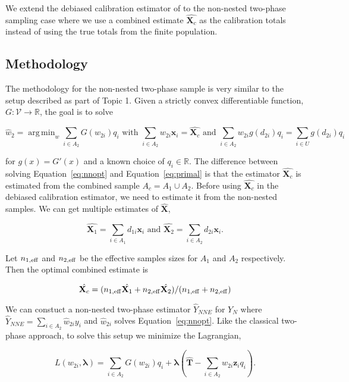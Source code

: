 \documentclass[12pt]{article}
\DeclareMathOperator*{\argmin}{arg\,min}
\renewcommand{\bf}[1]{\mathbf{#1}}
\begin{document}
We extend the debiased calibration estimator of \cite{kwon2024debiased} to the
non-nested two-phase sampling case where we use a combined estimate 
$\hat{\bm X_c}$ as the calibration totals instead of using the true totals from
the finite population.

\subsection{Methodology}

The methodology for the non-nested two-phase sample is very similar to the setup
described as part of Topic 1. Given a strictly convex differentiable function,
$G: \mathcal{V} \to \mathbb{R}$, the goal is to solve

\begin{equation}\label{eq:nnopt}
\hat w_2 = \argmin_w \sum_{i \in A_2} G\left(w_{2i}\right) q_i 
\text{ with } 
\sum_{i \in A_2} w_{2i} \bf x_i = \hat{\bf X_{c}} \text{ and } 
\sum_{i \in A_2} w_{2i} g(d_{2i}) q_i = \sum_{i \in U} g(d_{2i}) q_i
\end{equation}

for $g(x) = G'(x)$ and a known choice of $q_i \in \mathbb{R}$. 
The difference
between solving Equation~\ref{eq:nnopt} and Equation~\ref{eq:primal} is that the
estimator $\hat{\bf X_c}$ is estimated from the combined sample $A_c = A_1 \cup
A_2$. Before using $\hat{\bf X_c}$ in the debiased calibration estimator, we
need to estimate it from the non-nested samples. We can get multiple estimates
of $\hat{\bf X}$, 

$$
\hat{\bf X_1} = \sum_{i \in A_1} d_{1i} \bf x_i \text{ and }
\hat{\bf X_2} = \sum_{i \in A_2} d_{2i} \bf x_i.
$$

Let $n_{1, \rm{eff}}$ and $n_{2, \rm{eff}}$ be the effective samples sizes for
$A_1$ and $A_2$ respectively. Then the optimal combined estimate is 

$$
\hat{\bf X_c} = (n_{1, \rm{eff}} \hat{\bf X_1} + n_{2, \rm{eff}}\hat{\bf X_2}) / 
(n_{1, \rm{eff}} + n_{2, \rm{eff}})
$$

We can constuct a non-nested two-phase estimator $\hat Y_{NNE}$ for $Y_N$ where
$\hat Y_{NNE} = \sum_{i \in A_2} \hat w_{2i} y_i$ and $\hat w_{2i}$ solves
Equation~\ref{eq:nnopt}. Like the classical two-phase approach, to solve this
setup we minimize the Lagrangian,

\begin{equation}\label{eq:legragedc2}
  L(w_{2i}, \bm \lambda) = \sum_{i \in A_2} G(w_{2i}) q_i + 
  \bm \lambda \left( \hat{\bf T} - \sum_{i \in A_2} w_{2i} \bf z_i q_i\right).
\end{equation}
\end{document}
